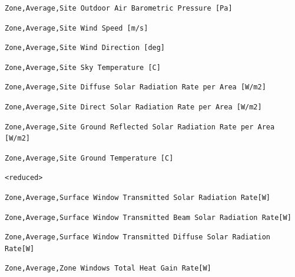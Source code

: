 \begin{lstlisting}
Zone,Average,Site Outdoor Air Barometric Pressure [Pa]
\end{lstlisting}

\begin{lstlisting}
Zone,Average,Site Wind Speed [m/s]
\end{lstlisting}

\begin{lstlisting}
Zone,Average,Site Wind Direction [deg]
\end{lstlisting}

\begin{lstlisting}
Zone,Average,Site Sky Temperature [C]
\end{lstlisting}

\begin{lstlisting}
Zone,Average,Site Diffuse Solar Radiation Rate per Area [W/m2]
\end{lstlisting}

\begin{lstlisting}
Zone,Average,Site Direct Solar Radiation Rate per Area [W/m2]
\end{lstlisting}

\begin{lstlisting}
Zone,Average,Site Ground Reflected Solar Radiation Rate per Area [W/m2]
\end{lstlisting}

\begin{lstlisting}
Zone,Average,Site Ground Temperature [C]
\end{lstlisting}

\begin{lstlisting}
<reduced>
\end{lstlisting}

\begin{lstlisting}
Zone,Average,Surface Window Transmitted Solar Radiation Rate[W]
\end{lstlisting}

\begin{lstlisting}
Zone,Average,Surface Window Transmitted Beam Solar Radiation Rate[W]
\end{lstlisting}

\begin{lstlisting}
Zone,Average,Surface Window Transmitted Diffuse Solar Radiation Rate[W]
\end{lstlisting}

\begin{lstlisting}
Zone,Average,Zone Windows Total Heat Gain Rate[W]
\end{lstlisting}

